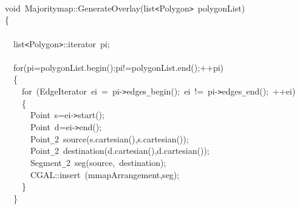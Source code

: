 \documentclass[a4paper,10pt]{article}
\begin{document}
{
\noindent \ttfamily
\jttstylea \\
\jttstylea \\
\jttstylea \\
\jttstylej void~\jttstylek Majoritymap::GenerateOverlay\jttstylei (\jttstylek list\verb#<#Polygon\verb#>#~polygonList\jttstylei )\\
\jttstylei \{\\
\jttstylea \\
\jttstylea ~~\jttstylek list\verb#<#Polygon\verb#>#::iterator~pi;\\
\jttstylea \\
\jttstylea ~~\jttstylee for\jttstylei (\jttstylek pi=polygonList.begin\jttstylei ()\jttstylek ;pi!=polygonList.end\jttstylei ()\jttstylek ;++pi\jttstylei )\\
\jttstylea ~~\jttstylei \{\\
\jttstylea ~~~~\jttstylee for~\jttstylei (\jttstylek EdgeIterator~ei~=~pi-\verb#>#edges\verb#_#begin\jttstylei ()\jttstylek ;~ei~!=~pi-\verb#>#edges\verb#_#end\jttstylei ()\jttstylek ;~++ei\jttstylei )\\
\jttstylea ~~~~\jttstylei \{\\
\jttstylea ~~~~~~\jttstylek Point~s=ei-\verb#>#start\jttstylei ()\jttstylek ;\\
\jttstylea ~~~~~~\jttstylek Point~d=ei-\verb#>#end\jttstylei ()\jttstylek ;\\
\jttstylea ~~~~~~\jttstylek Point\verb#_#2~source\jttstylei (\jttstylek s.cartesian\jttstylei (\jttstylei )\jttstylek ,s.cartesian\jttstylei (\jttstylei ))\jttstylek ;\\
\jttstylea ~~~~~~\jttstylek Point\verb#_#2~destination\jttstylei (\jttstylek d.cartesian\jttstylei (\jttstylei )\jttstylek ,d.cartesian\jttstylei (\jttstylei ))\jttstylek ;\\
\jttstylea ~~~~~~\jttstylek Segment\verb#_#2~seg\jttstylei (\jttstylek source,~destination\jttstylei )\jttstylek ;\\
\jttstylea ~~~~~~\jttstylek CGAL::insert~\jttstylei (\jttstylek mmapArrangement,seg\jttstylei )\jttstylek ;\\
\jttstylea ~~~~\jttstylei \}\\
\jttstylea ~~\jttstylei \}\\
}
\end{document}

